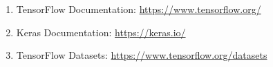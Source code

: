 \documentclass[10pt]{article}
\begin{document}
\begin{enumerate}
\item
TensorFlow Documentation:
\url{https://www.tensorflow.org/}

\item
Keras Documentation:
\url{https://keras.io/}

\item
TensorFlow Datasets:
\url{https://www.tensorflow.org/datasets}

\end{enumerate}

\end{document}
